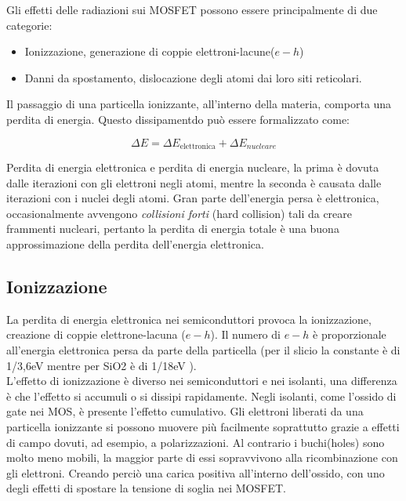 
Gli effetti delle radiazioni sui MOSFET possono essere principalmente di due categorie\cite{bib:Effetti_Radiazioni_1987}:
\begin{itemize}
	\item Ionizzazione, generazione di coppie elettroni-lacune($e-h$)
	\item Danni da spostamento, dislocazione degli atomi dai loro siti reticolari.
\end{itemize}
Il passaggio di una particella ionizzante, all'interno della materia, comporta una perdita di energia. Questo dissipamentdo può essere formalizzato come:

$$ \Delta E = \Delta E_{\text{elettronica}} + \Delta E_{nucleare} $$

Perdita di energia elettronica e perdita di energia nucleare, la prima è dovuta dalle iterazioni con gli elettroni negli atomi, mentre la seconda è causata dalle iterazioni con i nuclei degli atomi.
Gran parte dell'energia persa è elettronica, occasionalmente avvengono \textit{collisioni forti} (hard collision) tali da creare frammenti nucleari, pertanto la perdita di energia totale è una buona approssimazione della perdita dell'energia elettronica\cite{bib:Effetti_Radiazioni_NASA}.
\\

\subsection{Ionizzazione}
La perdita di energia elettronica nei semiconduttori provoca la ionizzazione, creazione di coppie elettrone-lacuna ($e-h$). Il numero di $e-h$ è proporzionale all'energia elettronica persa da parte della particella (per il slicio la constante è di 1/3,6eV mentre per SiO2 è di 1/18eV \cite{bib:Effetti_Radiazioni_NASA}).
\\

L'effetto di ionizzazione è diverso nei semiconduttori e nei isolanti, una differenza è che l'effetto si accumuli o si dissipi rapidamente.
Negli isolanti, come l'ossido di gate nei MOS, è presente l'effetto cumulativo. Gli elettroni liberati da una particella ionizzante si possono muovere più facilmente soprattutto grazie a effetti di campo dovuti, ad esempio, a polarizzazioni.
Al contrario i buchi(holes) sono molto meno mobili, la maggior parte di essi sopravvivono alla ricombinazione con gli elettroni. Creando perciò una carica positiva all'interno dell'ossido, con uno degli effetti di spostare la tensione di soglia nei MOSFET.
\\

